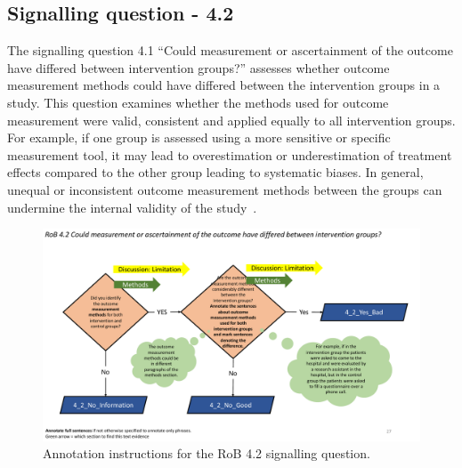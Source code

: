 \documentclass[sn-mathphys,Numbered]{sn-jnl}%
\begin{document}
\subsection*{Signalling question - 4.2 }
\label{subsec:4_2}
%
The signalling question 4.1 ``Could measurement or ascertainment of the outcome have differed between intervention groups?'' assesses whether outcome measurement methods could have differed between the intervention groups in a study.
This question examines whether the methods used for outcome measurement were valid, consistent and applied equally to all intervention groups.
For example, if one group is assessed using a more sensitive or specific measurement tool, it may lead to overestimation or underestimation of treatment effects compared to the other group leading to systematic biases.
In general, unequal or inconsistent outcome measurement methods between the groups can undermine the internal validity of the study~\cite{enwald2010preventing}. %

%
%
%
\begin{figure}[hbt]
    \centering
    \includegraphics[width=\textwidth]{figures/4_2.pdf}
    \caption{Annotation instructions for the RoB 4.2 signalling question.}
    \label{fig:4_2}
\end{figure}
%
%
%
\end{document}
